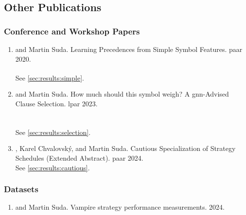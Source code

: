 \subsection{Other Publications}

\subsubsection{Conference and Workshop Papers}

\begin{enumerate}

\item {} and Martin Suda.
Learning Precedences from Simple Symbol Features.
\Acrfull{paar} 2020.
\cite{DBLP:conf/cade/Bartek020}
\\ 
\\ See \cref{sec:results:simple}.

\item {} and Martin Suda.
How much should this symbol weigh? A \acrshort{gnn}-Advised Clause Selection.
\Acrfull{lpar} 2023.
\cite{DBLP:conf/lpar/Bartek023}
\\ 
\\ 
\\ See \cref{sec:results:selection}.

\item {}, Karel Chvalovský, and Martin Suda.
Cautious Specialization of Strategy Schedules (Extended Abstract).
\Acrfull{paar} 2024.
\cite{DBLP:conf/paar/BartekC024}
\\ See \cref{sec:results:cautious}.

\end{enumerate}


\subsubsection{Datasets}

\begin{enumerate}
\item {} and Martin Suda.
Vampire strategy performance measurements.
2024.
\cite{bartek10814478}
\end{enumerate}

